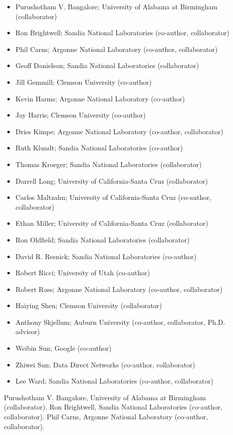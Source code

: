 \documentclass[11pt]{article}
\begin{document}
\begin{itemize}
\item Purushotham V. Bangalore; University of Alabama at Birmingham (collaborator)
\item Ron Brightwell; Sandia National Laboratories (co-author, collaborator)
\item Phil Carns; Argonne National Laboratory (co-author, collaborator)
\item Geoff Danielson; Sandia National Laboratories (collaborator)
\item Jill Gemmill; Clemson University (co-author)
\item Kevin Harms; Argonne National Laboratory (co-author)
\item Jay Harris; Clemson University (co-author)
\item Dries Kimpe; Argonne National Laboratory (co-author, collaborator)
\item Ruth Klundt; Sandia National Laboratories (co-author)
\item Thomas Kroeger; Sandia National Laboratories (collaborator)
\item Darrell Long; University of California-Santa Cruz (collaborator)
\item Carlos Maltzahn; University of California-Santa Cruz (co-author, collaborator)
\item Ethan Miller; University of California-Santa Cruz (collaborator)
\item Ron Oldfield; Sandia National Laboratories (collaborator)
\item David R. Resnick; Sandia National Laboratories (co-author)
\item Robert Ricci; University of Utah (co-author)
\item Robert Ross; Argonne National Laboratory (co-author, collaborator)
\item Haiying Shen; Clemson University (collaborator)
\item Anthony Skjellum; Auburn University (co-author, collaborator, Ph.D. advisor)
\item Weibin Sun; Google (co-author)
\item Zhiwei Sun; Data Direct Networks (co-author, collaborator)
\item Lee Ward; Sandia National Laboratories (co-author, collaborator)
\end{itemize}
\fi
Purushotham V. Bangalore, University of Alabama at Birmingham (collaborator).
Ron Brightwell, Sandia National Laboratories (co-author, collaborator).
Phil Carns, Argonne National Laboratory (co-author, collaborator).
\end{document}
